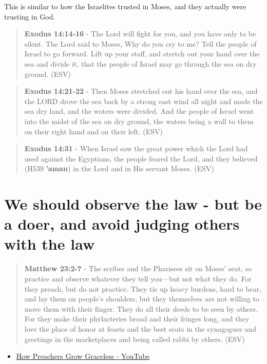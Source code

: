 \documentclass[11pt]{article}
\begin{document}
This is similar to how the Israelites trusted in Moses, and they actually were trusting in God.

\begin{quote}
\textbf{Exodus 14:14-16} - The Lord will fight for you, and you have only to be silent.  The Lord said to Moses, Why do you cry to me? Tell the people of Israel to go forward.  Lift up your staff, and stretch out your hand over the sea and divide it, that the people of Israel may go through the sea on dry ground. (ESV)
\end{quote}

\begin{quote}
\textbf{Exodus 14:21-22} - Then Moses stretched out his hand over the sea, and the LORD drove the sea back by a strong east wind all night and made the sea dry land, and the waters were divided. And the people of Israel went into the midst of the sea on dry ground, the waters being a wall to them on their right hand and on their left. (ESV)
\end{quote}

\begin{quote}
\textbf{Exodus 14:31} - When Israel saw the great power which the Lord had used against the Egyptians, the people feared the Lord, and they believed (H539 \textbf{'aman}) in the Lord and in His servant Moses. (ESV)
\end{quote}

\section{We should observe the law - but be a doer, and avoid judging others with the law}
\label{sec:org878a9b0}
\begin{quote}
\textbf{Matthew 23:2-7} - The scribes and the Pharisees sit on Moses' seat, so practice and observe whatever they tell you—but not what they do. For they preach, but do not practice. They tie up heavy burdens, hard to bear, and lay them on people's shoulders, but they themselves are not willing to move them with their finger. They do all their deeds to be seen by others. For they make their phylacteries broad and their fringes long, and they love the place of honor at feasts and the best seats in the synagogues and greetings in the marketplaces and being called rabbi by others. (ESV)
\end{quote}

\begin{itemize}
\item \href{https://www.youtube.com/watch?v=alOI2zxIPgc}{How Preachers Grow Graceless - YouTube}
\end{itemize}
\end{document}
